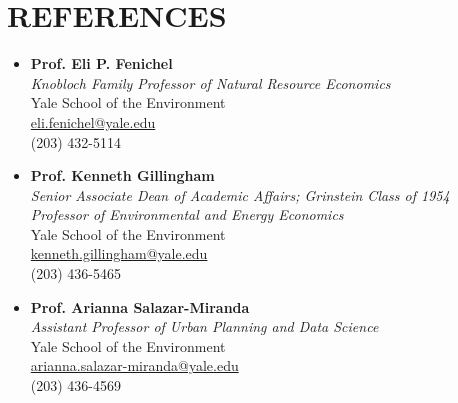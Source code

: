 \documentclass[11pt]{article}
\begin{document}
\section*{REFERENCES}

\begin{itemize}
    \item \textbf{Prof. Eli P. Fenichel}\\
    \textit{Knobloch Family Professor of Natural Resource Economics}\\
    Yale School of the Environment \\
    \href{mailto:eli.fenichel@yale.edu}{eli.fenichel@yale.edu} \\
    (203) 432-5114
    \item  \textbf{Prof. Kenneth Gillingham}\\
    \textit{Senior Associate Dean of Academic Affairs; Grinstein Class of 1954 Professor of Environmental and Energy Economics}\\
    Yale School of the Environment\\
    \href{mailto:kenneth.gillingham@yale.edu}{kenneth.gillingham@yale.edu}\\
    (203) 436-5465
    \item \textbf{Prof. Arianna Salazar-Miranda} \\
    \textit{Assistant Professor of Urban Planning and Data Science} \\
    Yale School of the Environment\\
    \href{mailto:arianna.salazar-miranda@yale.edu}{arianna.salazar-miranda@yale.edu}\\
    (203) 436-4569
\end{itemize}





\end{document}
